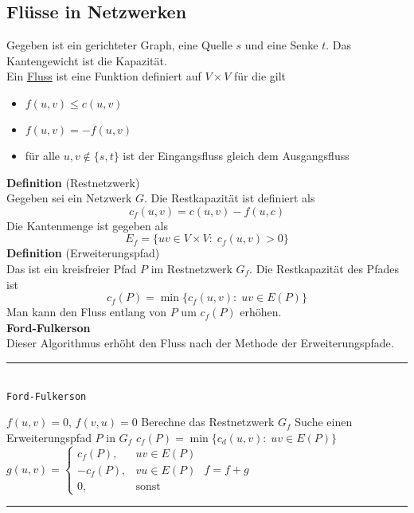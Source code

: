 \documentclass[a4paper, 12pt]{article}
\begin{document}
	\subsection{Flüsse in Netzwerken}
	Gegeben ist ein gerichteter Graph, eine Quelle $s$ und eine Senke $t$. Das Kantengewicht ist die Kapazität.\\
	Ein \underline{Fluss} ist eine Funktion definiert auf $V\times V$ für die gilt \begin{itemize}
		\item $f(u,v) \leq c(u,v)$
		\item $f(u,v) = -f(u,v)$
		\item für alle $u,v \notin \{s,t\}$ ist der Eingangsfluss gleich dem Ausgangsfluss
	\end{itemize}
	\textbf{Definition} (Restnetzwerk)\\
	Gegeben sei ein Netzwerk $G$. Die Restkapazität ist definiert als \[c_f(u,v) = c(u,v) - f(u,c)\]
	Die Kantenmenge ist gegeben als \[E_f = \{uv \in V\times V: \; c_f(u,v) > 0\}\]
	\textbf{Definition} (Erweiterungspfad)\\
	Das ist ein kreisfreier Pfad $P$ im Restnetzwerk $G_f$. Die Restkapazität des Pfades ist \[c_f(P) = \min\{c_f(u,v): \; uv \in E(P)\}\]
	Man kann den Fluss entlang von $P$ um $c_f(P)$ erhöhen.\\
	\textbf{Ford-Fulkerson}\\
	Dieser Algorithmus erhöht den Fluss nach der Methode der Erweiterungspfade.
	\par\noindent\rule{\textwidth}{0.4pt}\\
	\texttt{Ford-Fulkerson}
	\begin{algorithmic}[1]
		\State $f(u,v) = 0$, $f(v,u) = 0$
		\EndFor
		\Repeat
		\State Berechne das Restnetzwerk $G_f$
		\State Suche einen Erweiterungspfad $P$ in $G_f$
		\State $c_f(P) = \min\{c_d(u,v): \; uv \in E(P)\}$
		\State $g(u,v) = \begin{cases}
			c_f(P),& uv \in E(P)\\
			-c_f(P),& vu \in E(P)\\
			0,& \text{sonst}
		\end{cases}$
		\State $f = f+g$
	\end{algorithmic}
	\par\noindent\rule{\textwidth}{0.4pt}\\
\end{document}
